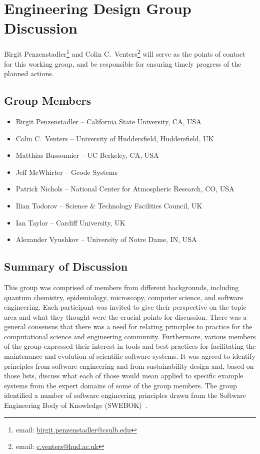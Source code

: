\section{Engineering Design Group Discussion}
\label{sec:appendix_eng_design}

Birgit Penzenstadler\footnote{email:
\href{mailto:birgit.penzenstadler@csulb.edu}{birgit.penzenstadler@csulb.edu}}
and Colin C.\ Venters\footnote{email:
\href{mailto:c.venters@hud.ac.uk}{c.venters@hud.ac.uk}} will serve as the points
of contact for this working group, and be responsible for ensuring timely
progress of the planned actions.

\subsection{Group Members}

\begin{itemize}
\item Birgit Penzenstadler -- California State University, CA, USA
\item Colin C.\ Venters -- University of Huddersfield, Huddersfield, UK
\item Matthias Bussonnier -- UC Berkeley, CA, USA
\item Jeff McWhirter -- Geode Systems 
\item Patrick Nichols -- National Center for Atmospheric Research, CO, USA
\item Ilian Todorov -- Science \& Technology Facilities Council, UK
\item Ian Taylor -- Cardiff University, UK
\item Alexander Vyushkov -- University of Notre Dame, IN, USA
\end{itemize}

\subsection{Summary of Discussion}

This group was comprised  of members from different backgrounds, including quantum
chemistry, epidemiology, microscopy, computer science, and software engineering.
Each participant was invited to give their perspective on the topic area and
what they thought were the crucial points for discussion. There was a general
consensus that there was a need for relating principles to practice for the
computational science and engineering community. Furthermore, various members of
the group expressed their interest in tools and best practices for facilitating
the maintenance and evolution of scientific software systems. It was agreed to
identify principles from software engineering and from sustainability design
and, based on those lists, discuss what each of those would mean applied to
specific example systems from the expert domains of some of the group members.
The group identified a number of software engineering principles drawn from the
Software Engineering Body of Knowledge (SWEBOK)~\cite{swebokv3}.

